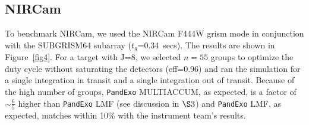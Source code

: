 \documentclass[iop]{emulateapj}
\begin{document}
\subsection{NIRCam}
To benchmark NIRCam, we used the NIRCam F444W grism 
mode in conjunction with the SUBGRISM64 subarray ($t_g$=0.34~secs). The results are shown in Figure~\ref{fig4}. For a target with J=8, we selected $n=55$ groups to optimize the duty cycle without saturating the detectors (eff=0.96) and ran the simulation for a single integration in transit and a single integration out of transit. Because of the high number of groups, \texttt{PandExo} MULTIACCUM, as expected, is a factor of $\sim \frac{6}{5}$ higher than \texttt{PandExo} LMF (see discussion in $\S3$) and \texttt{PandExo} LMF, as expected, matches within 10\% with the instrument team's results. 
\end{document}
